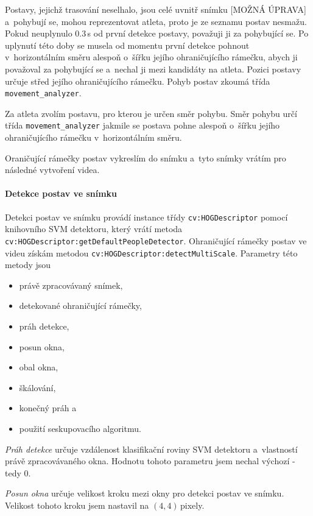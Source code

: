 Postavy, jejichž trasování neselhalo, jsou celé uvnitř snímku [MOŽNÁ ÚPRAVA] a~pohybují se, mohou reprezentovat atleta, proto je ze seznamu postav nesmažu. Pokud neuplynulo $0.3$\,\rm s od první detekce postavy, považuji ji za pohybující se. Po uplynutí této doby se musela od momentu první detekce pohnout v~horizontálním směru alespoň o~šířku jejího ohraničujícího rámečku, abych ji považoval za pohybující se a~nechal ji mezi kandidáty na atleta. Pozici postavy určuje střed jejího ohraničujícího rámečku. Pohyb postav zkoumá třída \texttt{movement\_analyzer}.

Za atleta zvolím postavu, pro kterou je určen směr pohybu. Směr pohybu určí třída \texttt{movement\_analyzer} jakmile se postava pohne alespoň o~šířku jejího ohraničujícího rámečku v~horizontálním směru.

Oraničující rámečky postav vykreslím do snímku a~tyto snímky vrátím pro následné vytvoření videa.

\paragraph{Detekce postav ve snímku}

Detekci postav ve snímku provádí instance třídy \texttt{cv\::HOGDescriptor} pomocí knihovního SVM detektoru, který vrátí metoda \texttt{cv\::HOGDescriptor\::getDefaultPeopleDetector}. Ohraničující rámečky postav ve videu získám metodou \texttt{cv\::HOGDescriptor\::detectMultiScale}. Parametry této metody jsou
\begin{itemize}
\item právě zpracovávaný snímek,
\item detekované ohraničující rámečky,
\item práh detekce,
\item posun okna,
\item obal okna,
\item škálování,
\item konečný práh a
\item použití seskupovacího algoritmu.
\end{itemize}

\emph{Práh detekce} určuje vzdálenost klasifikační roviny SVM detektoru a~vlastností právě zpracovávaného okna. Hodnotu tohoto parametru jsem nechal výchozí - tedy $0$.

\emph{Posun okna} určuje velikost kroku mezi okny pro detekci postav ve snímku. Velikost tohoto kroku jsem nastavil na $(4,4)$\,\rm pixely.

